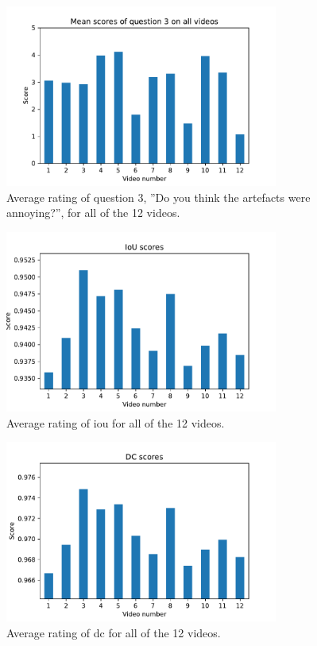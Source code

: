 \begin{figure}[H]
    \centering
    \includegraphics[width=0.8\textwidth]{img/questions/question_3.pdf}
    \caption{Average rating of question 3, ''Do you think the artefacts were annoying?'', for all of the 12 videos.}
    \label{fig:video_rating_q3}
\end{figure}


\begin{figure}[H]
    \centering
    \includegraphics[width=0.8\textwidth]{img/results_objective_measures/IoU.pdf}
    \caption{Average rating of \acrlong{iou} for all of the 12 videos.}
    \label{fig:video_rating_iou}
\end{figure}

\begin{figure}[H]
    \centering
    \includegraphics[width=0.8\textwidth]{img/results_objective_measures/DC.pdf}
    \caption{Average rating of \acrlong{dc} for all of the 12 videos.}
    \label{fig:video_rating_dc}
\end{figure}



